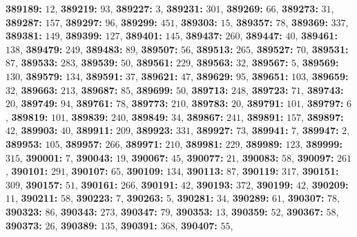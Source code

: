 \textsf{\bfseries 389189:} $12$, \textsf{\bfseries 389219:} $93$, \textsf{\bfseries 389227:} $3$, \textsf{\bfseries 389231:} $301$, \textsf{\bfseries 389269:} $66$, \textsf{\bfseries 389273:} $31$, \textsf{\bfseries 389287:} $157$, \textsf{\bfseries 389297:} $96$, \textsf{\bfseries 389299:} $451$, \textsf{\bfseries 389303:} $15$, \textsf{\bfseries 389357:} $78$, \textsf{\bfseries 389369:} $337$, \textsf{\bfseries 389381:} $149$, \textsf{\bfseries 389399:} $127$, \textsf{\bfseries 389401:} $145$, \textsf{\bfseries 389437:} $260$, \textsf{\bfseries 389447:} $40$, \textsf{\bfseries 389461:} $138$, \textsf{\bfseries 389479:} $249$, \textsf{\bfseries 389483:} $89$, \textsf{\bfseries 389507:} $56$, \textsf{\bfseries 389513:} $265$, \textsf{\bfseries 389527:} $70$, \textsf{\bfseries 389531:} $87$, \textsf{\bfseries 389533:} $283$, \textsf{\bfseries 389539:} $50$, \textsf{\bfseries 389561:} $229$, \textsf{\bfseries 389563:} $32$, \textsf{\bfseries 389567:} $5$, \textsf{\bfseries 389569:} $130$, \textsf{\bfseries 389579:} $134$, \textsf{\bfseries 389591:} $37$, \textsf{\bfseries 389621:} $47$, \textsf{\bfseries 389629:} $95$, \textsf{\bfseries 389651:} $103$, \textsf{\bfseries 389659:} $32$, \textsf{\bfseries 389663:} $213$, \textsf{\bfseries 389687:} $85$, \textsf{\bfseries 389699:} $50$, \textsf{\bfseries 389713:} $248$, \textsf{\bfseries 389723:} $71$, \textsf{\bfseries 389743:} $20$, \textsf{\bfseries 389749:} $94$, \textsf{\bfseries 389761:} $78$, \textsf{\bfseries 389773:} $210$, \textsf{\bfseries 389783:} $20$, \textsf{\bfseries 389791:} $101$, \textsf{\bfseries 389797:} $6$, \textsf{\bfseries 389819:} $101$, \textsf{\bfseries 389839:} $240$, \textsf{\bfseries 389849:} $34$, \textsf{\bfseries 389867:} $241$, \textsf{\bfseries 389891:} $157$, \textsf{\bfseries 389897:} $42$, \textsf{\bfseries 389903:} $40$, \textsf{\bfseries 389911:} $209$, \textsf{\bfseries 389923:} $331$, \textsf{\bfseries 389927:} $73$, \textsf{\bfseries 389941:} $7$, \textsf{\bfseries 389947:} $2$, \textsf{\bfseries 389953:} $105$, \textsf{\bfseries 389957:} $266$, \textsf{\bfseries 389971:} $210$, \textsf{\bfseries 389981:} $229$, \textsf{\bfseries 389989:} $123$, \textsf{\bfseries 389999:} $315$, \textsf{\bfseries 390001:} $7$, \textsf{\bfseries 390043:} $19$, \textsf{\bfseries 390067:} $45$, \textsf{\bfseries 390077:} $21$, \textsf{\bfseries 390083:} $58$, \textsf{\bfseries 390097:} $261$, \textsf{\bfseries 390101:} $291$, \textsf{\bfseries 390107:} $65$, \textsf{\bfseries 390109:} $134$, \textsf{\bfseries 390113:} $87$, \textsf{\bfseries 390119:} $317$, \textsf{\bfseries 390151:} $309$, \textsf{\bfseries 390157:} $51$, \textsf{\bfseries 390161:} $266$, \textsf{\bfseries 390191:} $42$, \textsf{\bfseries 390193:} $372$, \textsf{\bfseries 390199:} $42$, \textsf{\bfseries 390209:} $11$, \textsf{\bfseries 390211:} $58$, \textsf{\bfseries 390223:} $7$, \textsf{\bfseries 390263:} $5$, \textsf{\bfseries 390281:} $34$, \textsf{\bfseries 390289:} $61$, \textsf{\bfseries 390307:} $78$, \textsf{\bfseries 390323:} $86$, \textsf{\bfseries 390343:} $273$, \textsf{\bfseries 390347:} $79$, \textsf{\bfseries 390353:} $13$, \textsf{\bfseries 390359:} $52$, \textsf{\bfseries 390367:} $58$, \textsf{\bfseries 390373:} $26$, \textsf{\bfseries 390389:} $135$, \textsf{\bfseries 390391:} $368$, \textsf{\bfseries 390407:} $55$, 
